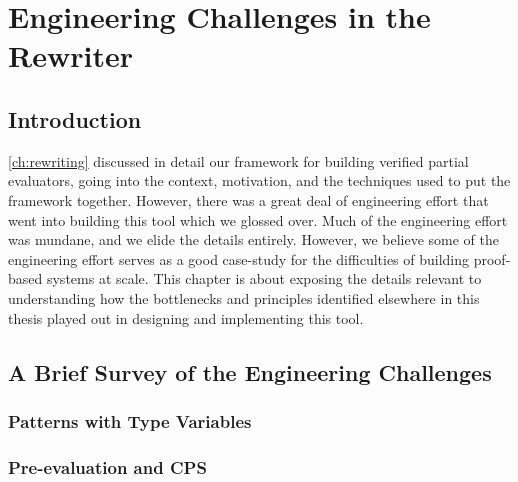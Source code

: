 \chapter{Engineering Challenges in the Rewriter} \label{ch:rewriting-more}
\section{Introduction} \label{sec:rewriting-more:intro}
\autoref{ch:rewriting} discussed in detail our framework for building verified partial evaluators, going into the context, motivation, and the techniques used to put the framework together.
However, there was a great deal of engineering effort that went into building this tool which we glossed over.
Much of the engineering effort was mundane, and we elide the details entirely.
However, we believe some of the engineering effort serves as a good case-study for the difficulties of building proof-based systems at scale.
This chapter is about exposing the details relevant to understanding how the bottlenecks and principles identified elsewhere in this thesis played out in designing and implementing this tool.

\section{A Brief Survey of the Engineering Challenges} \label{sec:rewriting-more:challenges-overview}
\subsection{Patterns with Type Variables}
\subsection{Pre-evaluation and CPS}
\subsection{}


